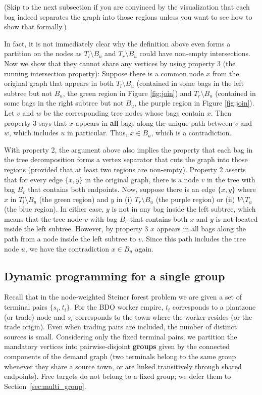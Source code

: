 \documentclass[11pt]{article}
\theoremstyle{definition}
\theoremstyle{remark}
\begin{document}
(Skip to the next subsection if you are convinced by the visualization that each bag indeed separates the graph into those regions unless you want to see how to show that formally.)

In fact, it is not immediately clear why the definition above even forms a partition on the nodes as $T_l \setminus B_u$ and $T_r \setminus B_u$ could have non-empty intersections. Now we show that they cannot share any vertices by using property 3 (the running intersection property): Suppose there is a common node $x$ from the original graph that appears in both $T_l \setminus B_u$ (contained in some bags in the left subtree but not $B_u$, the green region in Figure \ref{fig:join}) and $T_r \setminus B_u$ (contained in some bags in the right subtree but not $B_u$, the purple region in Figure \ref{fig:join}). Let $v$ and $w$ be the corresponding tree nodes whose bags contain $x$. Then property 3 says that $x$ appears in \textbf{all} bags along the unique path between $v$ and $w$, which includes $u$ in particular. Thus, $x \in B_u$, which is a contradiction.

With property 2, the argument above also implies the property that each bag in the tree decomposition forms a vertex separator that cuts the graph into those regions (provided that at least two regions are non-empty). Property 2 asserts that for every edge $\{x, y\}$ in the original graph, there is a node $v$ in the tree with bag $B_v$ that contains both endpoints. Now, suppose there is an edge $\{x, y\}$ where $x$ in $T_l \setminus B_u$ (the green region) and $y$ in (i) $T_r \setminus B_u$ (the purple region) or (ii) $V \setminus T_u$ (the blue region). In either case, $y$ is not in any bag inside the left subtree, which means that the tree node $v$ with bag $B_v$ that contains both $x$ and $y$ is not located inside the left subtree. However, by property 3 $x$ appears in all bags along the path from a node inside the left subtree to $v$. Since this path includes the tree node $u$, we have the contradiction $x \in B_u$ again.


\subsection{Dynamic programming for a single group}
Recall that in the node-weighted Steiner forest problem we are given a set of terminal pairs $\{s_i, t_i\}$. For the BDO worker empire, $t_i$ corresponds to a plantzone (or trade) node and $s_i$ corresponds to the town where the worker resides (or the trade origin). Even when trading pairs are included, the number of distinct sources is small. Considering only the fixed terminal pairs, we partition the mandatory vertices into pairwise-disjoint \textbf{groups} given by the connected components of the demand graph (two terminals belong to the same group whenever they share a source town, or are linked transitively through shared endpoints). Free targets do not belong to a fixed group; we defer them to Section~\ref{sec:multi_group}.
\end{document}
